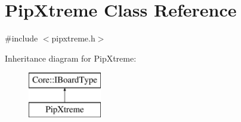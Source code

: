\hypertarget{class_pip_xtreme}{\section{\-Pip\-Xtreme \-Class \-Reference}
\label{class_pip_xtreme}
}


{\ttfamily \#include $<$pipxtreme.\-h$>$}

\-Inheritance diagram for \-Pip\-Xtreme\-:\begin{figure}[H]
\begin{center}
\leavevmode
\includegraphics[height=2.000000cm]{class_pip_xtreme}
\end{center}
\end{figure}

